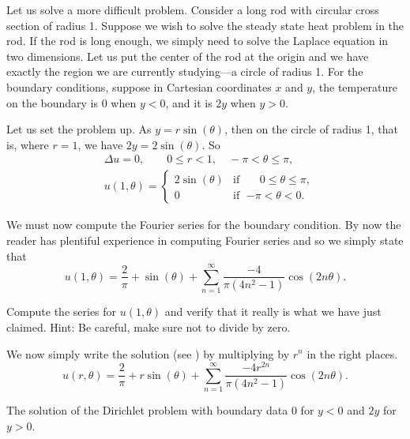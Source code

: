 \documentclass{ximera}
\begin{document}
\begin{example}
    Let us solve a more difficult problem.  Consider a long rod with circular cross section of radius 1.  Suppose we wish to solve the steady state heat problem in the rod. If the rod is long enough, we simply need to solve the Laplace equation in two dimensions.  Let us put the center of the rod at the origin and we have exactly the region we are currently studying---a circle of radius 1.  For the boundary conditions, suppose in Cartesian coordinates $x$ and $y$, the temperature on the boundary is 0 when $y < 0$, and it is $2y$ when $y > 0$.
    
    Let us set the problem up. As $y = r\sin(\theta)$, then on the circle of radius 1, that is, where $r=1$, we have $2y = 2\sin(\theta)$.  So
    \begin{align*}
        & \Delta u = 0 , \qquad 0 \leq r < 1, \quad -\pi < \theta \leq \pi,\\
        & u(1,\theta) = 
        \begin{cases}
            2\sin(\theta) & \text{if } \; \phantom{-}0 \leq \theta \leq \pi, \\
            0 & \text{if } \; {-\pi} < \theta < 0.
        \end{cases}
    \end{align*}
    
    We must now compute the Fourier series for the boundary condition.  By now the reader has plentiful experience in computing Fourier series and so we simply state that 
    \begin{equation*}
        u(1,\theta) = \frac{2}{\pi} + \sin(\theta) + \sum_{n=1}^\infty \frac{-4}{\pi(4n^2-1)} \cos(2n\theta) .
    \end{equation*}
    
    \begin{exercise}
        Compute the series for $u(1,\theta)$ and verify that it really is what we have just claimed.  Hint: Be careful, make sure not to divide by zero.
    \end{exercise}
    
    We now simply write the solution (see ) by multiplying by $r^n$ in the right places.
    \begin{equation*}
        u(r,\theta) =  \frac{2}{\pi} + r\sin(\theta) + \sum_{n=1}^\infty \frac{-4r^{2n}}{\pi(4n^2-1)} \cos(2n\theta) .
    \end{equation*}
    \begin{myfig}
        \capstart
        \caption{The solution of the Dirichlet problem with boundary data 0 for $y < 0$ and $2y$ for $y > 0$.\label{dirichdisc:zero2yfig}}
    \end{myfig}
\end{example}
\end{document}
